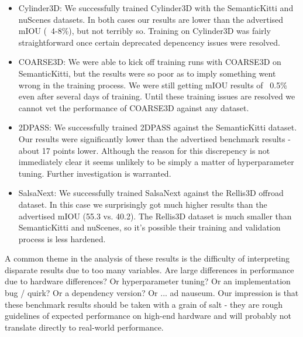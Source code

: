 \begin{itemize}
  \item Cylinder3D: We successfully trained Cylinder3D with the SemanticKitti and nuScenes datasets. In both cases our results are lower than the advertised mIOU (~4-8\%), but not terribly so. Training on Cylinder3D was fairly straightforward once certain deprecated depencency issues were resolved.
  \item COARSE3D: We were able to kick off training runs with COARSE3D on SemanticKitti, but the results were so poor as to imply something went wrong in the training process. We were still getting mIOU results of ~0.5\% even after several days of training. Until these training issues are resolved we cannot vet the performance of COARSE3D against any dataset.
  \item 2DPASS: We successfully trained 2DPASS against the SemanticKitti dataset. Our results were significantly lower than the advertised benchmark results - about 17 points lower. Although the reason for this discrepency is not immediately clear it seems unlikely to be simply a matter of hyperparameter tuning. Further investigation is warranted.
  \item SalsaNext: We successfully trained SalsaNext against the Rellis3D offroad dataset. In this case we surprisingly got much higher results than the advertised mIOU (55.3 vs. 40.2). The Rellis3D dataset is much smaller than SemanticKitti and nuScenes, so it's possible their training and validation process is less hardened.
\end{itemize}

A common theme in the analysis of these results is the difficulty of interpreting disparate results due to too many variables. Are large differences in performance due to hardware differences? Or hyperparameter tuning? Or an implementation bug / quirk? Or a dependency version? Or ... ad nauseum. Our impression is that these benchmark results should be taken with a grain of salt - they are rough guidelines of expected performance on high-end hardware and will probably not translate directly to real-world performance.



